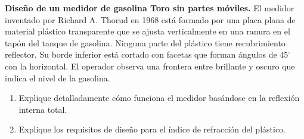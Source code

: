 \item \textbf{Diseño de un medidor de gasolina Toro sin partes móviles.}
El medidor inventado por Richard A. Thorud en 1968 está formado por una placa plana de material plástico transparente que se ajusta verticalmente en una ranura en el tapón del tanque de gasolina. Ninguna parte del plástico tiene recubrimiento reflector. Su borde inferior está cortado con facetas que forman ángulos de $45^\circ$ con la horizontal. El operador observa una frontera entre brillante y oscuro que indica el nivel de la gasolina.
\begin{enumerate}
    \item Explique detalladamente cómo funciona el medidor basándose en la reflexión interna total.
    \item Explique los requisitos de diseño para el índice de refracción del plástico.
\end{enumerate}